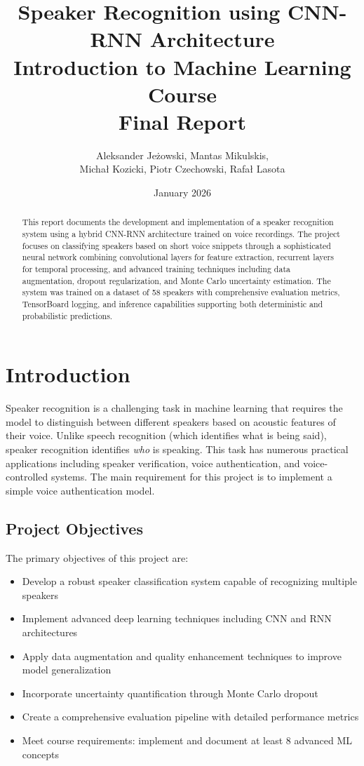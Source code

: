 \documentclass[12pt,a4paper]{article}
\title{\textbf{Speaker Recognition using CNN-RNN Architecture}\\
    Introduction to Machine Learning Course\\
    Final Report}
\author{Aleksander Jeżowski, Mantas Mikulskis, \\
 Michał Kozicki, Piotr Czechowski, Rafał Lasota}
\date{January 2026}
\newcommand{\numSpeakers}{58}
\begin{document}
\maketitle

\begin{abstract}
This report documents the development and implementation of a speaker recognition system using a hybrid CNN-RNN 
architecture trained on voice recordings.
The project focuses on classifying speakers based on short voice snippets through a sophisticated neural network combining convolutional layers for feature extraction,
recurrent layers for temporal processing, and advanced training techniques including data augmentation, dropout regularization, and Monte Carlo uncertainty estimation.
The system was trained on a dataset of \numSpeakers{} speakers with comprehensive evaluation metrics, TensorBoard logging, and inference capabilities supporting both deterministic and probabilistic predictions.
\end{abstract}



\newpage
\tableofcontents
\newpage

\section{Introduction}

Speaker recognition is a challenging task in machine learning that requires the model to distinguish between different speakers based on acoustic features of their voice.
Unlike speech recognition (which identifies what is being said), speaker recognition identifies \textit{who} is speaking.
This task has numerous practical applications including speaker verification, voice authentication, and voice-controlled systems.
The main requirement for this project is to implement a simple voice authentication model.

\subsection{Project Objectives}

The primary objectives of this project are:
\begin{itemize}
    \item Develop a robust speaker classification system capable of recognizing multiple speakers
    \item Implement advanced deep learning techniques including CNN and RNN architectures
    \item Apply data augmentation and quality enhancement techniques to improve model generalization
    \item Incorporate uncertainty quantification through Monte Carlo dropout
    \item Create a comprehensive evaluation pipeline with detailed performance metrics
    \item Meet course requirements: implement and document at least 8 advanced ML concepts
\end{itemize}
\end{document}
